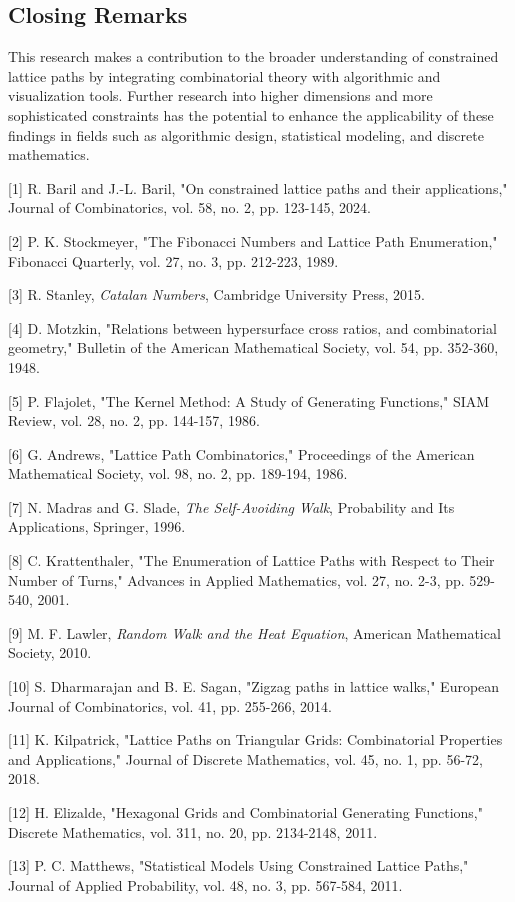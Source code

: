 \documentclass{article}
\begin{document}
\subsection{Closing Remarks}
This research makes a contribution to the broader understanding of constrained lattice paths by integrating combinatorial theory with algorithmic and visualization tools. Further research into higher dimensions and more sophisticated constraints has the potential to enhance the applicability of these findings in fields such as algorithmic design, statistical modeling, and discrete mathematics.



\begin{thebibliography}{99}

[1] R. Baril and J.-L. Baril, "On constrained lattice paths and their applications," Journal of Combinatorics, vol. 58, no. 2, pp. 123-145, 2024.

[2] P. K. Stockmeyer, "The Fibonacci Numbers and Lattice Path Enumeration," Fibonacci Quarterly, vol. 27, no. 3, pp. 212-223, 1989.

[3] R. Stanley, \textit{Catalan Numbers}, Cambridge University Press, 2015.

[4] D. Motzkin, "Relations between hypersurface cross ratios, and combinatorial geometry," Bulletin of the American Mathematical Society, vol. 54, pp. 352-360, 1948.

[5] P. Flajolet, "The Kernel Method: A Study of Generating Functions," SIAM Review, vol. 28, no. 2, pp. 144-157, 1986.

[6] G. Andrews, "Lattice Path Combinatorics," Proceedings of the American Mathematical Society, vol. 98, no. 2, pp. 189-194, 1986.

[7] N. Madras and G. Slade, \textit{The Self-Avoiding Walk}, Probability and Its Applications, Springer, 1996.

[8] C. Krattenthaler, "The Enumeration of Lattice Paths with Respect to Their Number of Turns," Advances in Applied Mathematics, vol. 27, no. 2-3, pp. 529-540, 2001.

[9] M. F. Lawler, \textit{Random Walk and the Heat Equation}, American Mathematical Society, 2010.

[10] S. Dharmarajan and B. E. Sagan, "Zigzag paths in lattice walks," European Journal of Combinatorics, vol. 41, pp. 255-266, 2014.

[11] K. Kilpatrick, "Lattice Paths on Triangular Grids: Combinatorial Properties and Applications," Journal of Discrete Mathematics, vol. 45, no. 1, pp. 56-72, 2018.

[12] H. Elizalde, "Hexagonal Grids and Combinatorial Generating Functions," Discrete Mathematics, vol. 311, no. 20, pp. 2134-2148, 2011.


[13] P. C. Matthews, "Statistical Models Using Constrained Lattice Paths," Journal of Applied Probability, vol. 48, no. 3, pp. 567-584, 2011.

\end{thebibliography}
\end{document}
